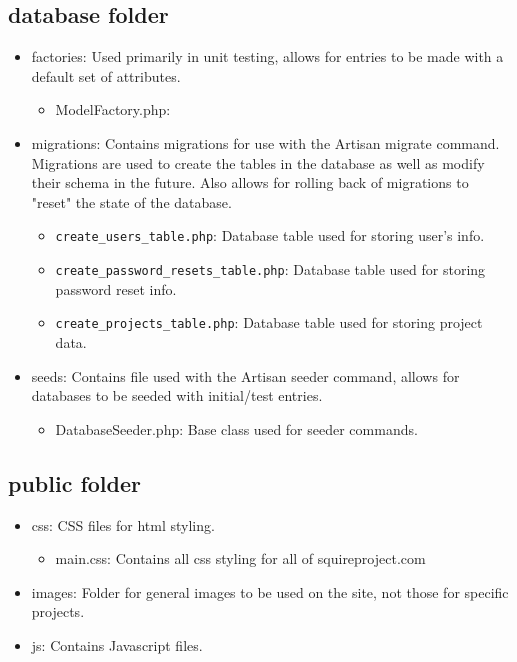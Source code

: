 \documentclass[11pt]{report}
\begin{document}
\subsection{database folder}
\begin{itemize}
    \item factories: Used primarily in unit testing, allows for entries to be made with a default set of attributes.
    \begin{itemize}
        \item ModelFactory.php: 
    \end{itemize}
    \item migrations: Contains migrations for use with the Artisan migrate command. Migrations are used to create the tables in the database as well as modify their schema in the future. Also allows for rolling back of migrations to "reset" the state of the database.
    \begin{itemize}
        \item \texttt{create\_users\_table.php}: Database table used for storing user's info.
        \item \texttt{create\_password\_resets\_table.php}: Database table used for storing password reset info.
        \item \texttt{create\_projects\_table.php}: Database table used for storing project data.
    \end{itemize}
    \item seeds: Contains file used with the Artisan seeder command, allows for databases to be seeded with initial/test entries.
    \begin{itemize}
        \item DatabaseSeeder.php: Base class used for seeder commands.
    \end{itemize}
\end{itemize}


\subsection{public folder}
\begin{itemize}
    \item css: CSS files for html styling.
    \begin{itemize}
        \item main.css: Contains all css styling for all of squireproject.com
    \end{itemize}
    \item images: Folder for general images to be used on the site, not those for specific projects.
    \item js: Contains Javascript files.
\end{itemize}
\end{document}
